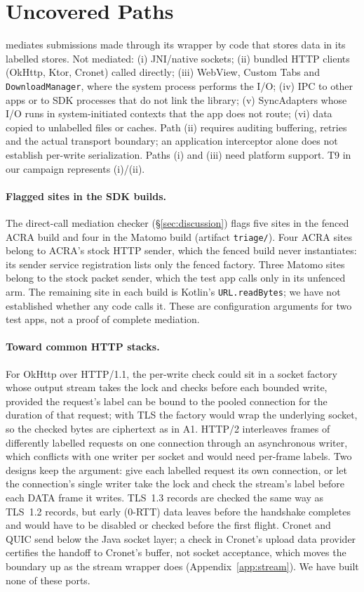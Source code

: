 \section{Uncovered Paths}
\label{app:uncovered}

\sys mediates submissions made through its wrapper by code that stores data in its labelled stores. Not mediated:
(i) JNI/native sockets; (ii) bundled HTTP clients (OkHttp, Ktor, Cronet) called directly; (iii) WebView, Custom Tabs and
\texttt{DownloadManager}, where the system process performs the I/O; (iv) IPC to other apps or to SDK processes that do not
link the library; (v) SyncAdapters whose I/O runs in system-initiated contexts that the app does not route; (vi) data
copied to unlabelled files or caches. Path (ii) requires auditing buffering, retries and the actual transport boundary; an application
interceptor alone does not establish per-write serialization. Paths (i) and (iii) need platform support. T9 in our campaign
represents (i)/(ii).

\paragraph{Flagged sites in the SDK builds.} The direct-call mediation checker (\S\ref{sec:discussion}) flags five sites in
the fenced ACRA build and four in the Matomo build (artifact \texttt{triage/}). Four ACRA sites belong to ACRA's stock
HTTP sender, which the fenced build never instantiates: its sender service registration lists only the fenced factory.
Three Matomo sites belong to the stock packet sender, which the test app calls only in its unfenced arm. The remaining
site in each build is Kotlin's \texttt{URL.readBytes}; we have not established whether any code calls it. These are
configuration arguments for two test apps, not a proof of complete mediation.

\paragraph{Toward common HTTP stacks.} For OkHttp over HTTP/1.1, the per-write check could sit in a socket factory whose
output stream takes the lock and checks before each bounded write, provided the request's label can be bound to the pooled
connection for the duration of that request; with TLS the factory would wrap the underlying socket, so the checked bytes
are ciphertext as in A1. HTTP/2 interleaves frames of differently labelled requests on one connection through an
asynchronous writer, which conflicts with one writer per socket and would need per-frame labels. Two designs keep the
argument: give each labelled request its own connection, or let the connection's single writer take the lock and check
the stream's label before each DATA frame it writes. TLS~1.3 records are checked the same way as TLS~1.2 records, but
early (0-RTT) data leaves before the handshake completes and would have to be disabled or checked before the first
flight. Cronet and QUIC send below the Java socket layer; a check in Cronet's upload data provider certifies the handoff
to Cronet's buffer, not socket acceptance, which moves the boundary up as the stream wrapper does
(Appendix~\ref{app:stream}). We have built none of these ports.

